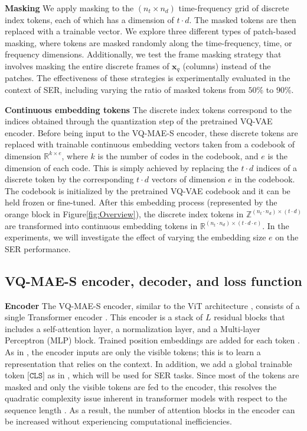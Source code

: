\documentclass{article}
\newcommand{\myparagraph}[1]{\noindent\textbf{#1}\hspace{.25cm}}
\begin{document}
\myparagraph{Masking} We apply masking to the $(n_t \times n_d)$ time-frequency grid of discrete index tokens, each of which has a dimension of $t \cdot d$. The masked tokens are then replaced with a trainable vector. We explore three different types of patch-based masking, where tokens are masked randomly along the time-frequency, time, or frequency dimensions. Additionally, we test the frame masking strategy that involves masking the entire discrete frames of $\mathbf{x}_q$ (columns) instead of the patches. The effectiveness of these strategies is experimentally evaluated in the context of SER, including varying the ratio of masked tokens from $50$\% to $90$\%.

\myparagraph{Continuous embedding tokens} The discrete index tokens correspond to the indices obtained through the quantization step of the pretrained VQ-VAE encoder. Before being input to the VQ-MAE-S encoder, these discrete tokens are replaced with trainable continuous embedding vectors taken from a codebook of dimension $\mathbb{R}^{k \times e}$, where $k$ is the number of codes in the codebook, and $e$ is the dimension of each code. This is simply achieved by replacing the $t \cdot d$ indices of a discrete token by the corresponding $t \cdot d$ vectors of dimension $e$ in the codebook. The codebook is initialized by the pretrained VQ-VAE codebook and it can be held frozen or fine-tuned. After this embedding process (represented by the orange block in Figure\ref{fig:Overview}), the discrete index tokens in $\mathbb{Z}^{(n_t \cdot n_d) \times (t \cdot d)}$ are transformed into continuous embedding tokens in $\mathbb{R}^{(n_t \cdot n_d) \times (t \cdot d \cdot e)}$. In the experiments, we will investigate the effect of varying the embedding size $e$ on the SER performance.

\subsection{VQ-MAE-S encoder, decoder, and loss function}



\myparagraph{Encoder} The VQ-MAE-S encoder, similar to the ViT architecture \cite{dosovitskiy2020image}, consists of a single Transformer encoder \cite{vaswani2017attention}. This encoder is a stack of $L$ residual blocks that includes a self-attention layer, a normalization layer, and a Multi-layer Perceptron (MLP) block. Trained position embeddings are added for each token \cite{devlin2018bert}. As in \cite{he2022masked}, the encoder inputs are only the visible tokens; this is to learn a representation that relies on the context. In addition, we add a global trainable token $\texttt{[CLS]}$ as in \cite{devlin2018bert}, which will be used for SER tasks. 
Since most of the tokens are masked and only the visible tokens are fed to the encoder, this resolves the quadratic complexity issue inherent in transformer models with respect to the sequence length \cite{he2022masked}. As a result, the number of attention blocks in the encoder can be increased without experiencing computational inefficiencies.
\end{document}
